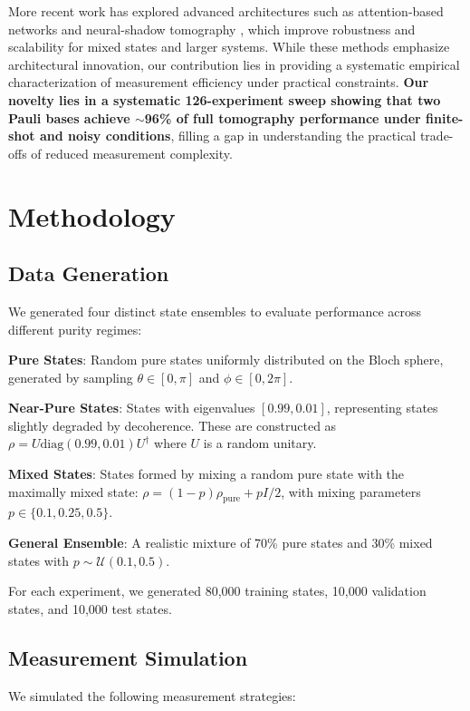 \documentclass[conference]{IEEEtran}
\begin{document}
More recent work has explored advanced architectures such as attention-based networks \cite{li2023attention} and neural-shadow tomography \cite{huang2022neural}, which improve robustness and scalability for mixed states and larger systems. While these methods emphasize architectural innovation, our contribution lies in providing a systematic empirical characterization of measurement efficiency under practical constraints. \textbf{Our novelty lies in a systematic 126-experiment sweep showing that two Pauli bases achieve $\sim$96\% of full tomography performance under finite-shot and noisy conditions}, filling a gap in understanding the practical trade-offs of reduced measurement complexity.

\section{Methodology}

\subsection{Data Generation}

We generated four distinct state ensembles to evaluate performance across different purity regimes:

\textbf{Pure States}: Random pure states uniformly distributed on the Bloch sphere, generated by sampling $\theta \in [0, \pi]$ and $\phi \in [0, 2\pi]$.

\textbf{Near-Pure States}: States with eigenvalues $[0.99, 0.01]$, representing states slightly degraded by decoherence. These are constructed as $\rho = U \text{diag}(0.99, 0.01) U^\dagger$ where $U$ is a random unitary.

\textbf{Mixed States}: States formed by mixing a random pure state with the maximally mixed state: $\rho = (1-p)\rho_{\text{pure}} + p I/2$, with mixing parameters $p \in \{0.1, 0.25, 0.5\}$.

\textbf{General Ensemble}: A realistic mixture of 70\% pure states and 30\% mixed states with $p \sim \mathcal{U}(0.1, 0.5)$.

For each experiment, we generated 80,000 training states, 10,000 validation states, and 10,000 test states.

\subsection{Measurement Simulation}

We simulated the following measurement strategies:
\end{document}
